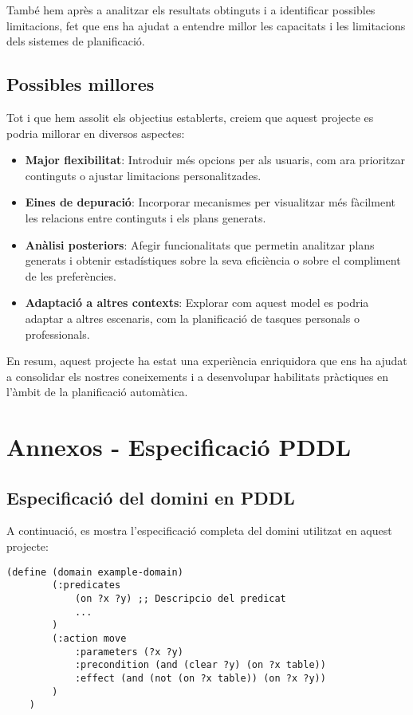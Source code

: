 \documentclass[a4paper]{article}
\begin{document}
	També hem après a analitzar els resultats obtinguts i a identificar possibles limitacions, fet que ens ha ajudat a entendre millor les capacitats i les limitacions dels sistemes de planificació.
	
	
	\subsection{Possibles millores}	

	Tot i que hem assolit els objectius establerts, creiem que aquest projecte es podria millorar en diversos aspectes:
	\begin{itemize}
		\item \textbf{Major flexibilitat}: Introduir més opcions per als usuaris, com ara prioritzar continguts o ajustar limitacions personalitzades.
		\item \textbf{Eines de depuració}: Incorporar mecanismes per visualitzar més fàcilment les relacions entre continguts i els plans generats.
		\item \textbf{Anàlisi posteriors}: Afegir funcionalitats que permetin analitzar plans generats i obtenir estadístiques sobre la seva eficiència o sobre el compliment de les preferències.
		\item \textbf{Adaptació a altres contexts}: Explorar com aquest model es podria adaptar a altres escenaris, com la planificació de tasques personals o professionals.
	\end{itemize}
	
	En resum, aquest projecte ha estat una experiència enriquidora que ens ha ajudat a consolidar els nostres coneixements i a desenvolupar habilitats pràctiques en l'àmbit de la planificació automàtica.	
	
	\newpage
	\appendix
	\section{Annexos - Especificació PDDL}
	
	\subsection{Especificació del domini en PDDL}
	
	A continuació, es mostra l'especificació completa del domini utilitzat en aquest projecte:
	
	\begin{lstlisting}[language=PDDL, caption={Especificació del domini en PDDL}, label={lst:dominiPDDL}]
	(define (domain example-domain)
		(:predicates
			(on ?x ?y) ;; Descripcio del predicat
			...
		)
		(:action move
			:parameters (?x ?y)
			:precondition (and (clear ?y) (on ?x table))
			:effect (and (not (on ?x table)) (on ?x ?y))
		)
	)
	\end{lstlisting}
	
\end{document}
